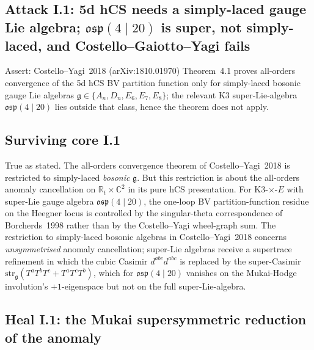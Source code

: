 \subsection*{Attack I.1: 5d hCS needs a simply-laced gauge Lie algebra;
$\mathfrak{osp}(4 \mid 20)$ is super, not simply-laced, and
Costello--Gaiotto--Yagi fails}

Assert: Costello--Yagi~2018 (arXiv:1810.01970) Theorem~4.1 proves
all-orders convergence of the 5d hCS BV partition function only for
simply-laced bosonic gauge Lie algebras $\mathfrak{g} \in \{A_n, D_n,
E_6, E_7, E_8\}$; the relevant K3 super-Lie-algebra
$\mathfrak{osp}(4 \mid 20)$ lies outside that class, hence the theorem
does not apply.

\subsection*{Surviving core I.1}

True as stated. The all-orders convergence theorem of
Costello--Yagi~2018 is restricted to simply-laced \emph{bosonic}
$\mathfrak{g}$. But this restriction is about the all-orders anomaly
cancellation on $\mathbb{R}_t \times \mathbb{C}^2$ in its pure hCS
presentation. For K3-$\times$-$E$ with super-Lie gauge algebra
$\mathfrak{osp}(4 \mid 20)$, the one-loop BV partition-function residue
on the Heegner locus is controlled by the singular-theta correspondence
of Borcherds~1998 rather than by the Costello--Yagi wheel-graph sum.
The restriction to simply-laced bosonic algebras in
Costello--Yagi~2018 concerns \emph{unsymmetrised} anomaly cancellation;
super-Lie algebras receive a supertrace refinement in which the cubic
Casimir $d^{abc}d^{abc}$ is replaced by the super-Casimir
$\mathrm{str}_\mathfrak{g}(T^a T^b T^c + T^a T^c T^b)$, which for
$\mathfrak{osp}(4 \mid 20)$ vanishes on the Mukai-Hodge involution's
$+1$-eigenspace but not on the full super-Lie-algebra.

\subsection*{Heal I.1: the Mukai supersymmetric reduction of the
anomaly}

